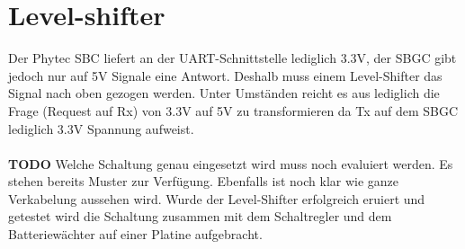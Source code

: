 \documentclass[12pt]{article} %
\begin{document}
	\section{Level-shifter}
	Der Phytec SBC liefert an der UART-Schnittstelle lediglich 3.3V, der SBGC gibt jedoch nur auf 5V Signale eine Antwort. Deshalb muss einem Level-Shifter das Signal nach oben gezogen werden. Unter Umständen reicht es aus lediglich die Frage (Request auf Rx) von 3.3V auf 5V zu transformieren da Tx auf dem SBGC lediglich 3.3V Spannung aufweist.\\
	\\
	\textbf{TODO}
	Welche Schaltung genau eingesetzt wird muss noch evaluiert werden. Es stehen bereits Muster zur Verfügung. Ebenfalls ist noch klar wie ganze Verkabelung aussehen wird. Wurde der Level-Shifter erfolgreich eruiert und getestet wird die Schaltung zusammen mit dem Schaltregler und dem Batteriewächter auf einer Platine aufgebracht.
\newpage
\renewcommand\refname{Literaturverzeichnis}
\begin{thebibliography}{99} %
	\raggedright
	


\end{thebibliography}

	
\end{document}
